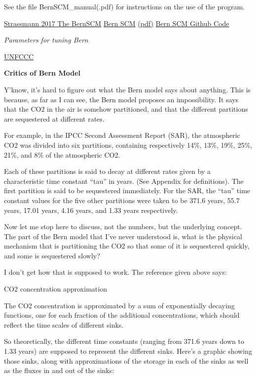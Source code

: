 \documentclass[
]{book}
\begin{document}
See the file BernSCM\_manual(.pdf) for instructions on the use of the program.

\href{https://www.researchgate.net/publication/320808211_The_Bern_Simple_Climate_Model_BernSCM_v10_an_extensible_and_fully_documented_open_source_reimplementation_of_the_Bern_reduced_form_model_for_global_carbon_cycle-climate_simulations}{Strassmann 2017 The BernSCM}
\href{https://doi.org/10.5281/zenodo.1038117}{Bern SCM}
\href{pdf/Strassmann_2017_BernSCM.pdf}{(pdf)}
\href{https://github.com/bernSCM/bernSCM}{Bern SCM Github Code}

\emph{Parameters for tuning Bern}

\href{https://unfccc.int/resource/brazil/carbon.html}{UNFCCC}

\textbf{Critics of Bern Model}

Y'know, it's hard to figure out what the Bern model says about anything. This is because, as far as I can see, the Bern model proposes an impossibility. It says that the CO2 in the air is somehow partitioned, and that the different partitions are sequestered at different rates.

For example, in the IPCC Second Assessment Report (SAR), the atmospheric CO2 was divided into six partitions, containing respectively 14\%, 13\%, 19\%, 25\%, 21\%, and 8\% of the atmospheric CO2.

Each of these partitions is said to decay at different rates given by a characteristic time constant ``tau'' in years. (See Appendix for definitions). The first partition is said to be sequestered immediately. For the SAR, the ``tau'' time constant values for the five other partitions were taken to be 371.6 years, 55.7 years, 17.01 years, 4.16 years, and 1.33 years respectively.

Now let me stop here to discuss, not the numbers, but the underlying concept. The part of the Bern model that I've never understood is, what is the physical mechanism that is partitioning the CO2 so that some of it is sequestered quickly, and some is sequestered slowly?

I don't get how that is supposed to work. The reference given above says:

CO2 concentration approximation

The CO2 concentration is approximated by a sum of exponentially decaying functions, one for each fraction of the additional concentrations, which should reflect the time scales of different sinks.

So theoretically, the different time constants (ranging from 371.6 years down to 1.33 years) are supposed to represent the different sinks. Here's a graphic showing those sinks, along with approximations of the storage in each of the sinks as well as the fluxes in and out of the sinks:
\end{document}
